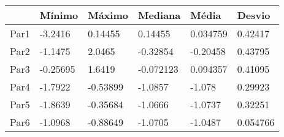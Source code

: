 \begin{tabular}{llllll}
& Mínimo & Máximo & Mediana & Média & Desvio \\ 
\hline 
Par1 & -3.2416 & 0.14455 & 0.14455 & 0.034759 & 0.42417 \\ 
Par2 & -1.1475 & 2.0465 & -0.32854 & -0.20458 & 0.43795 \\ 
Par3 & -0.25695 & 1.6419 & -0.072123 & 0.094357 & 0.41095 \\ 
Par4 & -1.7922 & -0.53899 & -1.0857 & -1.078 & 0.29923 \\ 
Par5 & -1.8639 & -0.35684 & -1.0666 & -1.0737 & 0.32251 \\ 
Par6 & -1.0968 & -0.88649 & -1.0705 & -1.0487 & 0.054766 \\ 
\hline 
\end{tabular}
